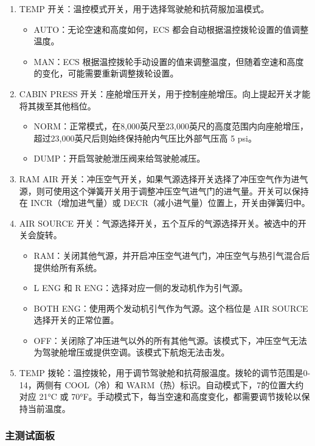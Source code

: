 \begin{enumerate}
  \item TEMP 开关：温控模式开关，用于选择驾驶舱和抗荷服加温模式。
  \begin{itemize}
    \item AUTO：无论空速和高度如何，ECS 都会自动根据温控拨轮设置的值调整温度。
    \item MAN：ECS 根据温控拨轮手动设置的值来调整温度，但随着空速和高度的变化，可能需要重新调整拨轮设置。
  \end{itemize}
  \item CABIN PRESS 开关：座舱增压开关，用于控制座舱增压。向上提起开关才能将其拨至其他档位。
  \begin{itemize}
    \item NORM：正常模式，在8,000英尺至23,000英尺的高度范围内向座舱增压，超过23,000英尺后则始终保持舱内气压比外部气压高 5 psi。
    \item DUMP：开启驾驶舱泄压阀来给驾驶舱减压。
  \end{itemize}
  \item RAM AIR 开关：冲压空气开关，如果气源选择开关选择了冲压空气作为进气源，则可使用这个弹簧开关用于调整冲压空气进气门的进气量。开关可以保持在 INCR（增加进气量）或 DECR（减小进气量）位置上，开关由弹簧归中。
  \item AIR SOURCE 开关：气源选择开关，五个互斥的气源选择开关。被选中的开关会旋转。
  \begin{itemize}
    \item RAM：关闭其他气源，并开启冲压空气进气门，冲压空气与热引气混合后提供给所有系统。
    \item L ENG 和 R ENG：选择对应一侧的发动机作为引气源。
    \item BOTH ENG：使用两个发动机引气作为气源。这个档位是 AIR SOURCE 选择开关的正常位置。
    \item OFF：关闭除了冲压进气以外的所有其他气源。该模式下，冲压空气无法为驾驶舱增压或提供空调。该模式下航炮无法击发。
  \end{itemize}
  \item TEMP 拨轮：温控拨轮，用于调节驾驶舱和抗荷服温度。拨轮的调节范围是0-14，两侧有 COOL（冷）和 WARM（热）标识。自动模式下，7的位置大约对应 21°C 或 70°F。手动模式下，每当空速和高度变化，都需要调节拨轮以保持当前温度。
\end{enumerate}

\subsubsection{主测试面板}

